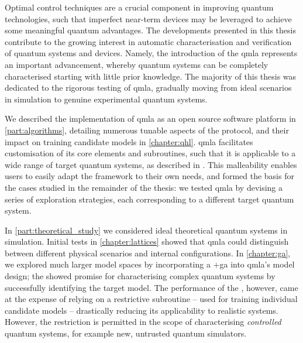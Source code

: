 
Optimal control techniques are a crucial component in improving quantum technologies, 
such that imperfect near-term devices may be leveraged to achieve some meaningful quantum advantages. 
The developments presented in this thesis contribute to the growing interest in automatic characterisation
and verification of quantum systems and devices. 
Namely, the introduction of the \gls{qmla} represents an important advancement, 
whereby quantum systems can be completely characterised starting with little prior knowledge. 
The majority of this thesis was dedicated to the rigorous testing of \gls{qmla},
gradually moving from ideal scenarios in simulation to genuine experimental quantum systems.
\par

We described the implementation of \gls{qmla} as an open source software platform in \cref{part:algorithms}, 
detailing numerous tunable aspects of the protocol, and their impact on training candidate models in \cref{chapter:qhl}.
\gls{qmla} facilitates customisation of its core elements and subroutines, 
such that it is applicable to a wide range of target quantum systems, as described in .
This malleability enables users to easily adapt the framework to their own needs,
and formed the basis for the cases studied in the remainder of the thesis:
we tested \gls{qmla} by devising a series of exploration strategies,
each corresponding to a different target quantum system.

\par 
In \cref{part:theoretical_study} we considered ideal theoretical quantum systems in simulation. 
Initial tests in \cref{chapter:lattices} showed that \gls{qmla} could distinguish between 
different physical scenarios and internal configurations. 
In \cref{chapter:ga}, we explored much larger \glspl{model space} by incorporating a \glsxtrlong+{ga} into \gls{qmla}'s model design;
the  showed promise for characterising complex quantum systems by successfully identifying the target model.
The performance of the , however, came at the expense of relying on a restrictive subroutine 
-- used for training individual candidate models -- 
drastically reducing its applicability to realistic systems. 
However, the restriction is permitted in the scope of characterising \emph{controlled} quantum systems, 
for example new, untrusted quantum simulators. 

\par 

